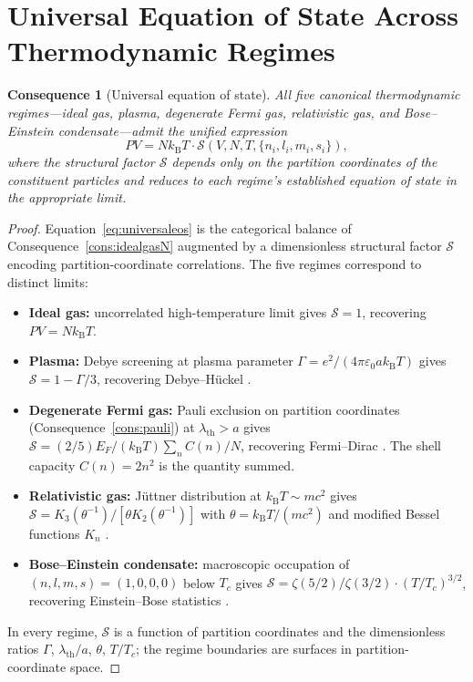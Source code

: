 \documentclass[11pt,twocolumn,a4paper]{article}
\theoremstyle{axiomstyle}
\theoremstyle{conseqstyle}
\newtheorem{consequence}{Consequence}
\theoremstyle{definition}
\theoremstyle{remark}
\newcommand{\kB}{k_{\mathrm{B}}}
\begin{document}
\section{Universal Equation of State Across Thermodynamic Regimes}
\label{sec:universaleos}

\begin{consequence}[Universal equation of state]\label{cons:universaleos}
All five canonical thermodynamic regimes---ideal gas, plasma, degenerate Fermi gas, relativistic gas, and Bose--Einstein condensate---admit the unified expression
\begin{equation}
PV=N\kB T\cdot\mathcal{S}(V,N,T,\{n_{i},l_{i},m_{i},s_{i}\}),
\label{eq:universaleos}
\end{equation}
where the \emph{structural factor} $\mathcal{S}$ depends only on the partition coordinates of the constituent particles and reduces to each regime's established equation of state in the appropriate limit.
\end{consequence}

\begin{proof}
Equation~\eqref{eq:universaleos} is the categorical balance of Consequence~\ref{cons:idealgasN} augmented by a dimensionless structural factor $\mathcal{S}$ encoding partition-coordinate correlations. The five regimes correspond to distinct limits:
\begin{itemize}[nosep]
\item \textbf{Ideal gas:} uncorrelated high-temperature limit gives $\mathcal{S}=1$, recovering $PV=N\kB T$.
\item \textbf{Plasma:} Debye screening at plasma parameter $\Gamma=e^{2}/(4\pi\varepsilon_{0}a\kB T)$ gives $\mathcal{S}=1-\Gamma/3$, recovering Debye--H\"uckel \citep{debye1923theory}.
\item \textbf{Degenerate Fermi gas:} Pauli exclusion on partition coordinates (Consequence~\ref{cons:pauli}) at $\lambda_{\mathrm{th}}>a$ gives $\mathcal{S}=(2/5)E_{F}/(\kB T)\sum_{n}C(n)/N$, recovering Fermi--Dirac \citep{fermi1926quantisierung}. The shell capacity $C(n)=2n^{2}$ is the quantity summed.
\item \textbf{Relativistic gas:} J\"uttner distribution at $\kB T\sim mc^{2}$ gives $\mathcal{S}=K_{3}(\theta^{-1})/[\theta K_{2}(\theta^{-1})]$ with $\theta=\kB T/(mc^{2})$ and modified Bessel functions $K_{n}$ \citep{juttner1911maxwell,synge1957relativistic}.
\item \textbf{Bose--Einstein condensate:} macroscopic occupation of $(n,l,m,s)=(1,0,0,0)$ below $T_{c}$ gives $\mathcal{S}=\zeta(5/2)/\zeta(3/2)\cdot(T/T_{c})^{3/2}$, recovering Einstein--Bose statistics \citep{einstein1924quantentheorie,bose1924}.
\end{itemize}
In every regime, $\mathcal{S}$ is a function of partition coordinates and the dimensionless ratios $\Gamma$, $\lambda_{\mathrm{th}}/a$, $\theta$, $T/T_{c}$; the regime boundaries are surfaces in partition-coordinate space.
\end{proof}
\end{document}
